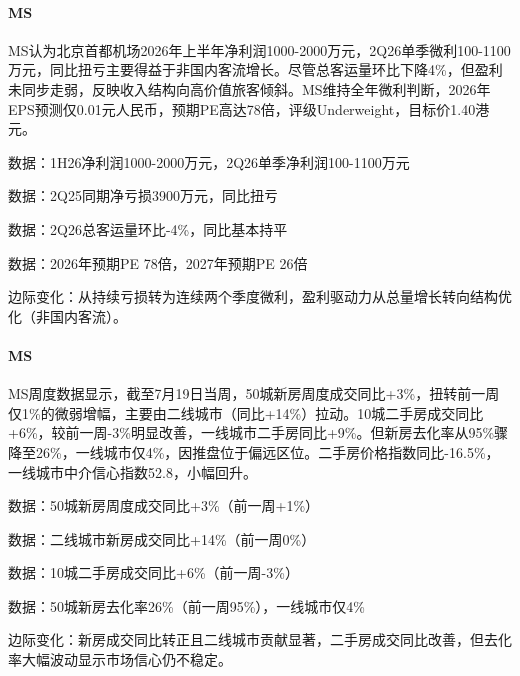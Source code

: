 \documentclass[11pt]{ctexart}
\begin{document}
\paragraph{MS} MS认为北京首都机场2026年上半年净利润1000-2000万元，2Q26单季微利100-1100万元，同比扭亏主要得益于非国内客流增长。尽管总客运量环比下降4\%，但盈利未同步走弱，反映收入结构向高价值旅客倾斜。MS维持全年微利判断，2026年EPS预测仅0.01元人民币，预期PE高达78倍，评级Underweight，目标价1.40港元。
{\small\color{refgray}数据：1H26净利润1000-2000万元，2Q26单季净利润100-1100万元\par}
{\small\color{refgray}数据：2Q25同期净亏损3900万元，同比扭亏\par}
{\small\color{refgray}数据：2Q26总客运量环比-4\%，同比基本持平\par}
{\small\color{refgray}数据：2026年预期PE 78倍，2027年预期PE 26倍\par}
{\small\color{refgray}边际变化：从持续亏损转为连续两个季度微利，盈利驱动力从总量增长转向结构优化（非国内客流）。\par}
\paragraph{MS} MS周度数据显示，截至7月19日当周，50城新房周度成交同比+3\%，扭转前一周仅1\%的微弱增幅，主要由二线城市（同比+14\%）拉动。10城二手房成交同比+6\%，较前一周-3\%明显改善，一线城市二手房同比+9\%。但新房去化率从95\%骤降至26\%，一线城市仅4\%，因推盘位于偏远区位。二手房价格指数同比-16.5\%，一线城市中介信心指数52.8，小幅回升。
{\small\color{refgray}数据：50城新房周度成交同比+3\%（前一周+1\%）\par}
{\small\color{refgray}数据：二线城市新房成交同比+14\%（前一周0\%）\par}
{\small\color{refgray}数据：10城二手房成交同比+6\%（前一周-3\%）\par}
{\small\color{refgray}数据：50城新房去化率26\%（前一周95\%），一线城市仅4\%\par}
{\small\color{refgray}边际变化：新房成交同比转正且二线城市贡献显著，二手房成交同比改善，但去化率大幅波动显示市场信心仍不稳定。\par}
\end{document}
